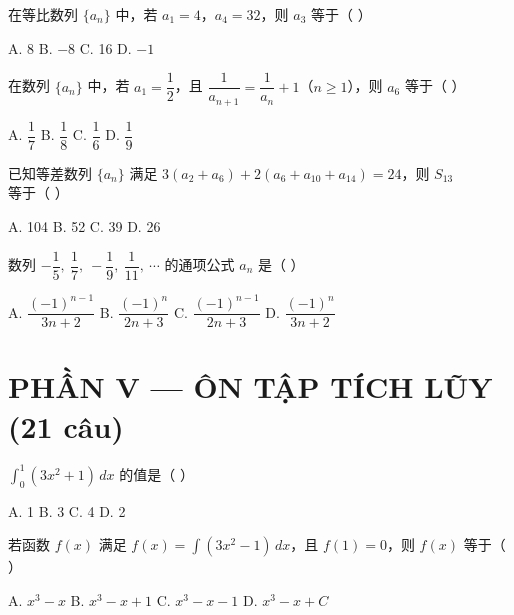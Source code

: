 \documentclass[11pt, a4paper]{article}
\begin{document}
\begin{baitap}[24]
在等比数列 $\{a_n\}$ 中，若 $a_1=4$，$a_4=32$，则 $a_3$ 等于（ ）
\par\vspace{3pt}
\noindent A. 8 \quad B. $-8$ \quad C. 16 \quad D. $-1$
\end{baitap}

\begin{baitap}[25]
在数列 $\{a_n\}$ 中，若 $a_1=\dfrac{1}{2}$，且 $\dfrac{1}{a_{n+1}}=\dfrac{1}{a_n}+1$（$n\ge1$），则 $a_6$ 等于（ ）
\par\vspace{3pt}
\noindent A. $\dfrac{1}{7}$ \quad B. $\dfrac{1}{8}$ \quad C. $\dfrac{1}{6}$ \quad D. $\dfrac{1}{9}$
\end{baitap}

\begin{baitap}[26]
已知等差数列 $\{a_n\}$ 满足 $3(a_2+a_6)+2(a_6+a_{10}+a_{14})=24$，则 $S_{13}$ 等于（ ）
\par\vspace{3pt}
\noindent A. 104 \quad B. 52 \quad C. 39 \quad D. 26
\end{baitap}

\begin{baitap}[27]
数列 $-\dfrac{1}{5},\ \dfrac{1}{7},\ -\dfrac{1}{9},\ \dfrac{1}{11},\ \cdots$ 的通项公式 $a_n$ 是（ ）
\par\vspace{3pt}
\noindent A. $\dfrac{(-1)^{n-1}}{3n+2}$ \quad B. $\dfrac{(-1)^{n}}{2n+3}$ \quad C. $\dfrac{(-1)^{n-1}}{2n+3}$ \quad D. $\dfrac{(-1)^{n}}{3n+2}$
\end{baitap}

\section{PHẦN V — ÔN TẬP TÍCH LŨY (21 câu)}

\begin{baitap}[28]
$\displaystyle\int_0^1 (3x^2+1)\,dx$ 的值是（ ）
\par\vspace{3pt}
\noindent A. 1 \quad B. 3 \quad C. 4 \quad D. 2
\end{baitap}

\begin{baitap}[29]
若函数 $f(x)$ 满足 $f(x)=\displaystyle\int (3x^2-1)\,dx$，且 $f(1)=0$，则 $f(x)$ 等于（ ）
\par\vspace{3pt}
\noindent A. $x^3-x$ \quad B. $x^3-x+1$ \quad C. $x^3-x-1$ \quad D. $x^3-x+C$
\end{baitap}
\end{document}
